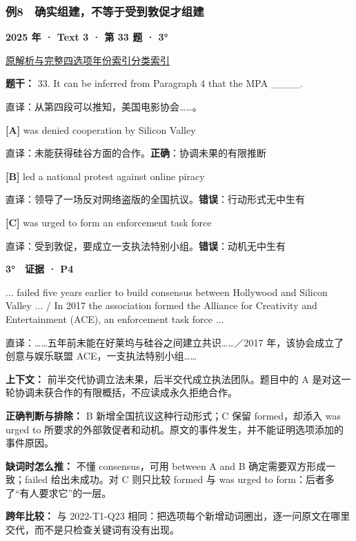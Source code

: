 \documentclass[11pt,a4paper]{article}
\begin{document}
\subsubsection{例8　确实组建，不等于受到敦促才组建}\label{case-2025-T3-Q33}
\noindent\textbf{2025 年 · Text 3 · 第 33 题 · 3°}\par\noindent \href{https://zj139.github.io/math-notes/english/c07bae9858bf4768714b07ae/\#q33}{原解析与完整四选项}\quad \hyperref[idx-2025-T3-Q33]{年份索引}\quad \hyperref[class-R04]{分类索引}\par\smallskip
\noindent\textbf{题干：} 33. It can be inferred from Paragraph 4 that the MPA \_\_\_\_.\par\smallskip
直译：从第四段可以推知，美国电影协会……。

\noindent\textbf{[A]} was denied cooperation by Silicon Valley\par\nopagebreak
\noindent 直译：未能获得硅谷方面的合作。\quad\textbf{正确}：协调未果的有限推断\par\smallskip
{}\noindent\textbf{[B]} led a national protest against online piracy\par\nopagebreak
\noindent 直译：领导了一场反对网络盗版的全国抗议。\quad\textbf{错误}：行动形式无中生有\par\smallskip
{}\noindent\textbf{[C]} was urged to form an enforcement task force\par\nopagebreak
\noindent 直译：受到敦促，要成立一支执法特别小组。\quad\textbf{错误}：动机无中生有\par\smallskip
\begin{evidence}\textbf{3°　证据 · P4}\par ... failed five years earlier to build consensus between Hollywood and Silicon Valley ... / In 2017 the association formed the Alliance for Creativity and Entertainment (ACE), an enforcement task force ...\par 直译：……五年前未能在好莱坞与硅谷之间建立共识……／2017 年，该协会成立了创意与娱乐联盟 ACE，一支执法特别小组……\end{evidence}
\noindent\textbf{上下文：} 前半交代协调立法未果，后半交代成立执法团队。题目中的 A 是对这一轮协调未获合作的有限概括，不应读成永久拒绝合作。\par\smallskip
\noindent\textbf{正确判断与排除：} B 新增全国抗议这种行动形式；C 保留 formed，却添入 was urged to 所要求的外部敦促者和动机。原文的事件发生，并不能证明选项添加的事件原因。\par\smallskip
\noindent\textbf{缺词时怎么推：} 不懂 consensus，可用 between A and B 确定需要双方形成一致；failed 给出未成功。对 C 则只比较 formed 与 was urged to form：后者多了“有人要求它”的一层。\par\smallskip
\noindent\textbf{跨年比较：} 与 2022-T1-Q23 相同：把选项每个新增动词圈出，逐一问原文在哪里交代，而不是只检查关键词有没有出现。\par\smallskip
\clearpage
\end{document}
